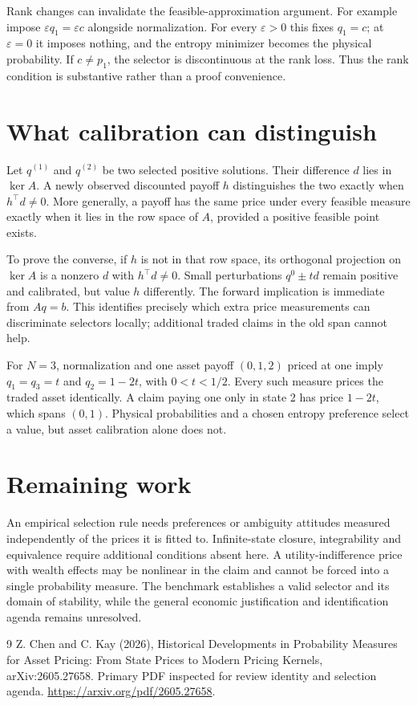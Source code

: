 \documentclass[11pt]{article}
\begin{document}
Rank changes can invalidate the feasible-approximation argument. For example impose $\varepsilon q_1=\varepsilon c$ alongside normalization. For every $\varepsilon>0$ this fixes $q_1=c$; at $\varepsilon=0$ it imposes nothing, and the entropy minimizer becomes the physical probability. If $c\ne p_1$, the selector is discontinuous at the rank loss. Thus the rank condition is substantive rather than a proof convenience.

\section*{What calibration can distinguish}
Let $q^{(1)}$ and $q^{(2)}$ be two selected positive solutions. Their difference $d$ lies in $\ker A$. A newly observed discounted payoff $h$ distinguishes the two exactly when $h^\top d\ne0$. More generally, a payoff has the same price under every feasible measure exactly when it lies in the row space of $A$, provided a positive feasible point exists.

To prove the converse, if $h$ is not in that row space, its orthogonal projection on $\ker A$ is a nonzero $d$ with $h^\top d\ne0$. Small perturbations $q^0\pm td$ remain positive and calibrated, but value $h$ differently. The forward implication is immediate from $Aq=b$. This identifies precisely which extra price measurements can discriminate selectors locally; additional traded claims in the old span cannot help.

For $N=3$, normalization and one asset payoff $(0,1,2)$ priced at one imply $q_1=q_3=t$ and $q_2=1-2t$, with $0<t<1/2$. Every such measure prices the traded asset identically. A claim paying one only in state 2 has price $1-2t$, which spans $(0,1)$. Physical probabilities and a chosen entropy preference select a value, but asset calibration alone does not.

\section*{Remaining work}
An empirical selection rule needs preferences or ambiguity attitudes measured independently of the prices it is fitted to. Infinite-state closure, integrability and equivalence require additional conditions absent here. A utility-indifference price with wealth effects may be nonlinear in the claim and cannot be forced into a single probability measure. The benchmark establishes a valid selector and its domain of stability, while the general economic justification and identification agenda remains unresolved.
\begin{thebibliography}{9}
 Z. Chen and C. Kay (2026), Historical Developments in Probability Measures for Asset Pricing: From State Prices to Modern Pricing Kernels, arXiv:2605.27658. Primary PDF inspected for review identity and selection agenda. \url{https://arxiv.org/pdf/2605.27658}.
\end{thebibliography}
\end{document}
